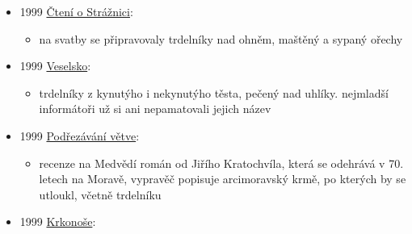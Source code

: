 \begin{itemize}
  \begin{itemize}
  \tightlist
  \item
    Jakub Vrbas (1858 - 1952), sepsal knížku na základě starých pramenů,
    co už nejsou dostupný
  \item
    s. 57 - trdelníky na rožňovém válci nad uhlíky, sypaný mákem a
    ořechy
  \item
    s. 76 - hody, smažený koblihy a trdelníky, zmiňuje rok 1868
  \item
    s. 111. smažený trdélníky
  \end{itemize}
\item
  1999
  \href{https://ceskadigitalniknihovna.cz/view/uuid:1205dd30-22f9-11ef-be46-0050568d319f?page=uuid\%3A744a56c4-b1cb-4846-840b-498bb5fc53a8&fulltext=trdeln\%C3\%ADk\%20OR\%20trdeln\%C3\%ADky\%20OR\%20trdeln\%C3\%ADk\%C5\%AF&source=mzk}{Čtení
  o Strážnici}:

  \begin{itemize}
  \tightlist
  \item
    na svatby se připravovaly trdelníky nad ohněm, maštěný a sypaný
    ořechy
  \end{itemize}
\item
  1999
  \href{https://ceskadigitalniknihovna.cz/view/uuid:9ee83d54-e4ea-4999-9b2d-7fd7bc1b19a1?page=uuid\%3A57ffd5a3-50a8-11e5-8200-0050569d679d&fulltext=trdeln\%C3\%ADk\%20OR\%20trdeln\%C3\%ADky\%20OR\%20trdeln\%C3\%ADk\%C5\%AF&source=mzk}{Veselsko}:

  \begin{itemize}
  \tightlist
  \item
    trdelníky z kynutýho i nekynutýho těsta, pečený nad uhlíky.
    nejmladší informátoři už si ani nepamatovali jejich název
  \end{itemize}
\item
  1999
  \href{https://ceskadigitalniknihovna.cz/view/uuid:42ab79d0-0672-11e4-83c7-005056827e51?page=uuid\%3A60685a60-33e0-11e4-8413-5ef3fc9ae867&fulltext=trdel*&source=nkp}{Podřezávání
  větve}:

  \begin{itemize}
  \tightlist
  \item
    recenze na Medvědí román od Jiřího Kratochvíla, která se odehrává v
    70. letech na Moravě, vypravěč popisuje arcimoravský krmě, po
    kterých by se utloukl, včetně trdelníku
  \end{itemize}
\item
  1999
  \href{https://ceskadigitalniknihovna.cz/uuid/uuid:688f803c-f890-4e66-986a-47d85c06d611}{Krkonoše}:


\end{itemize}
